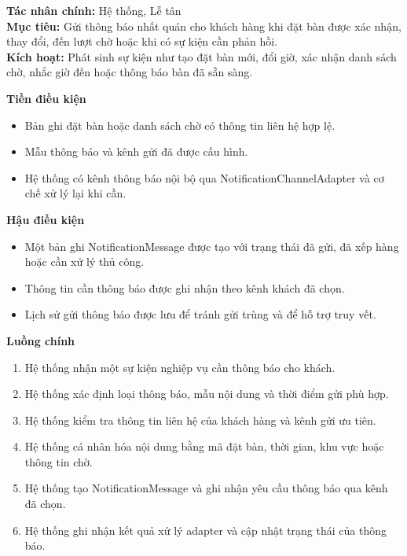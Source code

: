 \documentclass[11pt,a4paper]{article}
\begin{document}
    \begin{usecasebox}[title={UC-RES-05 --- Gửi thông báo cho khách hàng}]
    \textbf{Tác nhân chính:} Hệ thống, Lễ tân\\
    \textbf{Mục tiêu:} Gửi thông báo nhất quán cho khách hàng khi đặt bàn được xác nhận, thay đổi, đến lượt chờ hoặc khi có sự kiện cần phản hồi.\\
    \textbf{Kích hoạt:} Phát sinh sự kiện như tạo đặt bàn mới, đổi giờ, xác nhận danh sách chờ, nhắc giờ đến hoặc thông báo bàn đã sẵn sàng.

    \medskip
    \textbf{Tiền điều kiện}
    \begin{itemize}[leftmargin=1.8em]
  \item Bản ghi đặt bàn hoặc danh sách chờ có thông tin liên hệ hợp lệ.
  \item Mẫu thông báo và kênh gửi đã được cấu hình.
  \item Hệ thống có kênh thông báo nội bộ qua \textsf{NotificationChannelAdapter} và cơ chế xử lý lại khi cần.
\end{itemize}

    \textbf{Hậu điều kiện}
    \begin{itemize}[leftmargin=1.8em]
  \item Một bản ghi \textsf{NotificationMessage} được tạo với trạng thái đã gửi, đã xếp hàng hoặc cần xử lý thủ công.
  \item Thông tin cần thông báo được ghi nhận theo kênh khách đã chọn.
  \item Lịch sử gửi thông báo được lưu để tránh gửi trùng và để hỗ trợ truy vết.
\end{itemize}

    \textbf{Luồng chính}
    \begin{enumerate}[leftmargin=1.8em]
  \item Hệ thống nhận một sự kiện nghiệp vụ cần thông báo cho khách.
  \item Hệ thống xác định loại thông báo, mẫu nội dung và thời điểm gửi phù hợp.
  \item Hệ thống kiểm tra thông tin liên hệ của khách hàng và kênh gửi ưu tiên.
  \item Hệ thống cá nhân hóa nội dung bằng mã đặt bàn, thời gian, khu vực hoặc thông tin chờ.
  \item Hệ thống tạo \textsf{NotificationMessage} và ghi nhận yêu cầu thông báo qua kênh đã chọn.
  \item Hệ thống ghi nhận kết quả xử lý adapter và cập nhật trạng thái của thông báo.
\end{enumerate}


\end{usecasebox}
\end{document}
